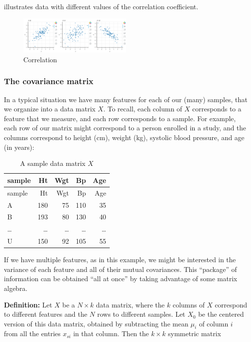 \documentclass[
]{article}
\begin{document}
 illustrates data with different values of the
correlation coefficient.

\begin{figure}
\hypertarget{fig:corrfig}{%
\centering
\includegraphics[width=0.5\textwidth,height=\textheight]{../img/correlation.png}
\caption{Correlation}\label{fig:corrfig}
}
\end{figure}

\hypertarget{sec:covarmat}{%
\subsubsection{The covariance matrix}\label{sec:covarmat}}

In a typical situation we have many features for each of our (many)
samples, that we organize into a data matrix \(X\). To recall, each
column of \(X\) corresponds to a feature that we measure, and each row
corresponds to a sample. For example, each row of our matrix might
correspond to a person enrolled in a study, and the columns correspond
to height (cm), weight (kg), systolic blood pressure, and age (in
years):

\begin{longtable}[]{@{}lrrrr@{}}
\caption{A sample data matrix \(X\) \label{tbl:data}}\tabularnewline
\toprule
sample & Ht & Wgt & Bp & Age\tabularnewline
\midrule
\endfirsthead
\toprule
sample & Ht & Wgt & Bp & Age\tabularnewline
\midrule
\endhead
A & 180 & 75 & 110 & 35\tabularnewline
B & 193 & 80 & 130 & 40\tabularnewline
\ldots{} & \ldots{} & \ldots{} & \ldots{} & \ldots{}\tabularnewline
U & 150 & 92 & 105 & 55\tabularnewline
\bottomrule
\end{longtable}

If we have multiple features, as in this example, we might be interested
in the variance of each feature and all of their mutual covariances.
This ``package'' of information can be obtained ``all at once'' by
taking advantage of some matrix algebra.

\textbf{Definition:} Let \(X\) be a \(N\times k\) data matrix, where the
\(k\) columns of \(X\) correspond to different features and the \(N\)
rows to different samples. Let \(X_{0}\) be the centered version of this
data matrix, obtained by subtracting the mean \(\mu_{i}\) of column
\(i\) from all the entries \(x_{si}\) in that column. Then the
\(k\times k\) symmetric matrix
\end{document}
